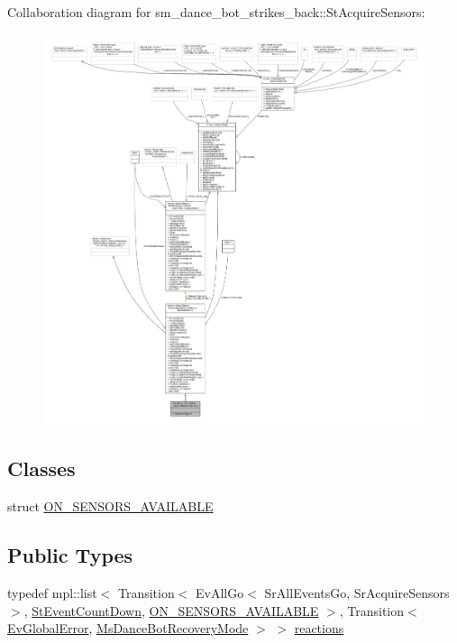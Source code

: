 Collaboration diagram for sm\+\_\+dance\+\_\+bot\+\_\+strikes\+\_\+back\+:\+:St\+Acquire\+Sensors\+:
\nopagebreak
\begin{figure}[H]
\begin{center}
\leavevmode
\includegraphics[width=350pt]{structsm__dance__bot__strikes__back_1_1StAcquireSensors__coll__graph}
\end{center}
\end{figure}
\subsection*{Classes}
\begin{DoxyCompactItemize}
\item 
struct \hyperlink{structsm__dance__bot__strikes__back_1_1StAcquireSensors_1_1ON__SENSORS__AVAILABLE}{O\+N\+\_\+\+S\+E\+N\+S\+O\+R\+S\+\_\+\+A\+V\+A\+I\+L\+A\+B\+LE}
\end{DoxyCompactItemize}
\subsection*{Public Types}
\begin{DoxyCompactItemize}
\item 
typedef mpl\+::list$<$ Transition$<$ Ev\+All\+Go$<$ Sr\+All\+Events\+Go, Sr\+Acquire\+Sensors $>$, \hyperlink{structsm__dance__bot__strikes__back_1_1StEventCountDown}{St\+Event\+Count\+Down}, \hyperlink{structsm__dance__bot__strikes__back_1_1StAcquireSensors_1_1ON__SENSORS__AVAILABLE}{O\+N\+\_\+\+S\+E\+N\+S\+O\+R\+S\+\_\+\+A\+V\+A\+I\+L\+A\+B\+LE} $>$, Transition$<$ \hyperlink{structsm__dance__bot__strikes__back_1_1EvGlobalError}{Ev\+Global\+Error}, \hyperlink{classsm__dance__bot__strikes__back_1_1MsDanceBotRecoveryMode}{Ms\+Dance\+Bot\+Recovery\+Mode} $>$ $>$ \hyperlink{structsm__dance__bot__strikes__back_1_1StAcquireSensors_a747e573013b729c07079c51427163cf5}{reactions}
\end{DoxyCompactItemize}
